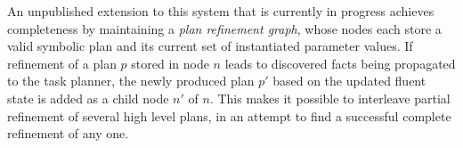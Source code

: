 An unpublished extension to this system that is currently in progress achieves completeness by
maintaining a \emph{plan refinement graph}, whose nodes each store a valid symbolic plan and
its current set of instantiated parameter values. If refinement of a plan $p$ stored in node
$n$ leads to discovered facts being propagated to the task planner, the newly produced plan $p'$ based on
the updated fluent state is added as a child node $n'$ of $n$. This makes it possible to interleave
partial refinement of several high level plans, in an attempt to find a successful complete refinement
of any one.

